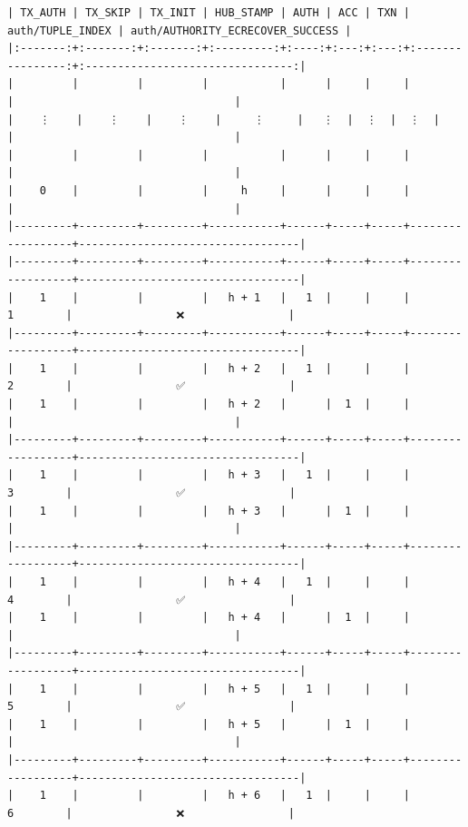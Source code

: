 \documentclass[varwidth=\maxdimen,margin=0.5cm,multi={verbatim}]{standalone}
\begin{document}
\begin{verbatim}
| TX_AUTH | TX_SKIP | TX_INIT | HUB_STAMP | AUTH | ACC | TXN | auth/TUPLE_INDEX | auth/AUTHORITY_ECRECOVER_SUCCESS |
|:-------:+:-------:+:-------:+:---------:+:----:+:---:+:---:+:----------------:+:--------------------------------:|
|         |         |         |           |      |     |     |                  |                                  |
|    ⋮    |    ⋮    |    ⋮    |     ⋮     |   ⋮  |  ⋮  |  ⋮  |                  |                                  |
|         |         |         |           |      |     |     |                  |                                  |
|    0    |         |         |     h     |      |     |     |                  |                                  |
|---------+---------+---------+-----------+------+-----+-----+------------------+----------------------------------|
|---------+---------+---------+-----------+------+-----+-----+------------------+----------------------------------|
|    1    |         |         |   h + 1   |   1  |     |     |         1        |                ❌                |
|---------+---------+---------+-----------+------+-----+-----+------------------+----------------------------------|
|    1    |         |         |   h + 2   |   1  |     |     |         2        |                ✅                |
|    1    |         |         |   h + 2   |      |  1  |     |                  |                                  |
|---------+---------+---------+-----------+------+-----+-----+------------------+----------------------------------|
|    1    |         |         |   h + 3   |   1  |     |     |         3        |                ✅                |
|    1    |         |         |   h + 3   |      |  1  |     |                  |                                  |
|---------+---------+---------+-----------+------+-----+-----+------------------+----------------------------------|
|    1    |         |         |   h + 4   |   1  |     |     |         4        |                ✅                |
|    1    |         |         |   h + 4   |      |  1  |     |                  |                                  |
|---------+---------+---------+-----------+------+-----+-----+------------------+----------------------------------|
|    1    |         |         |   h + 5   |   1  |     |     |         5        |                ✅                |
|    1    |         |         |   h + 5   |      |  1  |     |                  |                                  |
|---------+---------+---------+-----------+------+-----+-----+------------------+----------------------------------|
|    1    |         |         |   h + 6   |   1  |     |     |         6        |                ❌                |

\end{verbatim}
\end{document}
